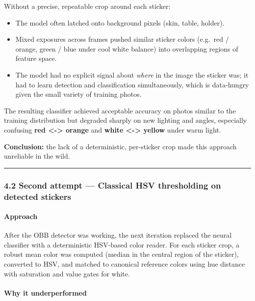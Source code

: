 \documentclass[
  11pt,
  a4paper,
]{article}
\providecommand{\tightlist}{%
  \setlength{\itemsep}{0pt}\setlength{\parskip}{0pt}}
\begin{document}
Without a precise, repeatable crop around each sticker:

\begin{itemize}
\tightlist
\item
  The model often latched onto background pixels (skin, table, holder).
\item
  Mixed exposures across frames pushed similar sticker colors (e.g.~red
  / orange, green / blue under cool white balance) into overlapping
  regions of feature space.
\item
  The model had no explicit signal about \emph{where} in the image the
  sticker was; it had to learn detection and classification
  simultaneously, which is data-hungry given the small variety of
  training photos.
\end{itemize}

The resulting classifier achieved acceptable accuracy on photos similar
to the training distribution but degraded sharply on new lighting and
angles, especially confusing \textbf{red \textless-\textgreater{}
orange} and \textbf{white \textless-\textgreater{} yellow} under warm
light.

\textbf{Conclusion:} the lack of a deterministic, per-sticker crop made
this approach unreliable in the wild.

\begin{center}\rule{0.5\linewidth}{0.5pt}\end{center}

\subsubsection{4.2 Second attempt --- Classical HSV thresholding on
detected
stickers}\label{second-attempt-classical-hsv-thresholding-on-detected-stickers}

\paragraph{Approach}\label{approach-2}

After the OBB detector was working, the next iteration replaced the
neural classifier with a deterministic HSV-based color reader. For each
sticker crop, a robust mean color was computed (median in the central
region of the sticker), converted to HSV, and matched to canonical
reference colors using hue distance with saturation and value gates for
white.

\paragraph{Why it underperformed}\label{why-it-underperformed-1}
\end{document}

